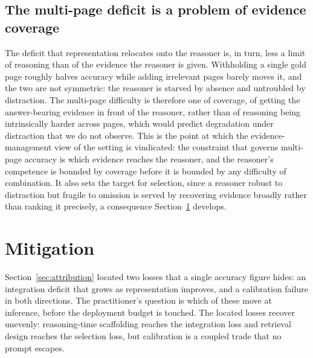 \documentclass[11pt]{article}
\begin{document}
\subsection{The multi-page deficit is a problem of evidence coverage}
\label{subsec:attr_coverage}

The deficit that representation relocates onto the reasoner is, in turn, less a limit of reasoning than of the evidence the reasoner is given. Withholding a single gold page roughly halves accuracy while adding irrelevant pages barely moves it, and the two are not symmetric: the reasoner is starved by absence and untroubled by distraction. The multi-page difficulty is therefore one of coverage, of getting the answer-bearing evidence in front of the reasoner, rather than of reasoning being intrinsically harder across pages, which would predict degradation under distraction that we do not observe. This is the point at which the evidence-management view of the setting is vindicated: the constraint that governs multi-page accuracy is which evidence reaches the reasoner, and the reasoner's competence is bounded by coverage before it is bounded by any difficulty of combination. It also sets the target for selection, since a reasoner robust to distraction but fragile to omission is served by recovering evidence broadly rather than ranking it precisely, a consequence Section~\ref{sec:mitigation} develops.

\section{Mitigation}
\label{sec:mitigation}

Section~\ref{sec:attribution} located two losses that a single accuracy figure hides: an integration deficit that grows as representation improves, and a calibration failure in both directions. The practitioner's question is which of these move at inference, before the deployment budget is touched. The located losses recover unevenly: reasoning-time scaffolding reaches the integration loss and retrieval design reaches the selection loss, but calibration is a coupled trade that no prompt escapes.
\end{document}

